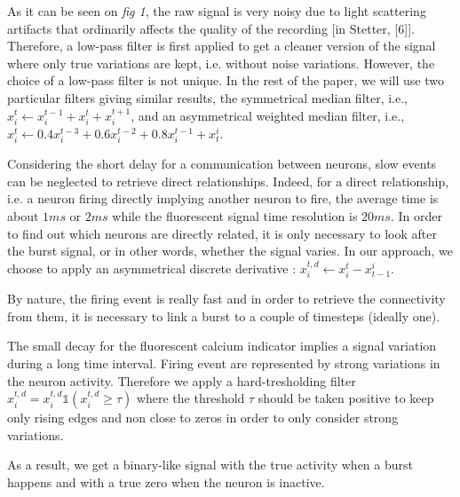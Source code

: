 \documentclass[wcp]{jmlr}
\begin{document}
As it can be seen on \textit{fig 1}, the raw signal is very noisy due to light
scattering artifacts that ordinarily affects the quality of the recording
[in Stetter, [6]]. Therefore, a low-pass filter is first applied to get a
cleaner version of the signal where only
true variations are kept, i.e. without noise variations. However, the choice of a low-pass
filter is not unique. In the rest of the paper, we will use two particular filters giving similar results, the
symmetrical median filter, i.e., $x^t_i \leftarrow x^{t-1}_i + x^{t}_i + x^{t+1}_i$,
and an asymmetrical weighted median filter, i.e.,
$x^t_i \leftarrow 0.4 x^{t-3}_i + 0.6 x^{t-2}_i + 0.8 x^{t-1}_i + x_{t}^i$.


Considering the short delay for a communication between
neurons, slow events can be neglected to retrieve direct relationships.
Indeed, for a direct relationship, i.e. a neuron firing directly implying another
neuron to fire, the average time is about $1ms$ or $2ms$ while the
fluorescent signal time resolution is $20ms$. In order to find out which neurons
are directly related, it is only necessary to look after the burst signal, or
in other words, whether the signal varies. In our approach, we choose to apply
an asymmetrical discrete derivative : $x^{t,d}_{i} \leftarrow x^{t}_i - x_{t-1}^i$.

By nature, the firing event is really fast and in order to
retrieve the connectivity from them, it is necessary to link a burst to a
couple of timesteps (ideally one).


The small decay for the fluorescent calcium indicator implies a signal
variation during a long time interval. Firing event are represented by
strong variations in the neuron activity. Therefore we apply a hard-tresholding
filter $x^{t,d}_i = x^{t,d}_i \mathbb{1}(x^{t,d}_i \geq \tau)$ where the
threshold $\tau$ should be taken positive to keep only rising edges and non
close to zeros in order to only consider strong variations.


As a result, we get a binary-like signal with the true activity when a burst
happens and with a true zero when the neuron is inactive.

\end{document}
